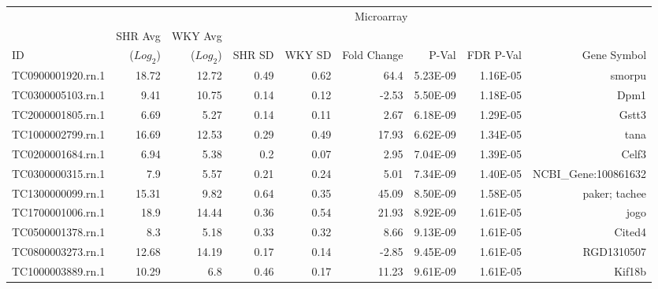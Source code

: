 \begin{sidewaystable}[]
\scriptsize
\centering
\begin{tabular}{lrrrrrrrr}
                  & \multicolumn{8}{c}{Microarray}                                                                                         \\
               & SHR Avg & WKY Avg &  & &  &    & &                    \\
ID                &  ($Log_{2}$) & ($Log_{2}$) & SHR SD & WKY SD & Fold Change & P-Val    & FDR P-Val & Gene Symbol                   \\
\hline
TC0900001920.rn.1 & 18.72          & 12.72          & 0.49   & 0.62   & 64.4        & 5.23E-09 & 1.16E-05  & smorpu                        \\
TC0300005103.rn.1 & 9.41           & 10.75          & 0.14   & 0.12   & -2.53       & 5.50E-09 & 1.18E-05  & Dpm1                          \\
TC2000001805.rn.1 & 6.69           & 5.27           & 0.14   & 0.11   & 2.67        & 6.18E-09 & 1.29E-05  & Gstt3                        \\
TC1000002799.rn.1 & 16.69          & 12.53          & 0.29   & 0.49   & 17.93       & 6.62E-09 & 1.34E-05  & tana                          \\
TC0200001684.rn.1 & 6.94           & 5.38           & 0.2    & 0.07   & 2.95        & 7.04E-09 & 1.39E-05  & Celf3                         \\
TC0300000315.rn.1 & 7.9            & 5.57           & 0.21   & 0.24   & 5.01        & 7.34E-09 & 1.40E-05  & NCBI\_Gene:100861632          \\
TC1300000099.rn.1 & 15.31          & 9.82           & 0.64   & 0.35   & 45.09       & 8.50E-09 & 1.58E-05  & paker; tachee                 \\
TC1700001006.rn.1 & 18.9           & 14.44          & 0.36   & 0.54   & 21.93       & 8.92E-09 & 1.61E-05  & jogo                          \\
TC0500001378.rn.1 & 8.3            & 5.18           & 0.33   & 0.32   & 8.66        & 9.13E-09 & 1.61E-05  & Cited4                        \\
TC0800003273.rn.1 & 12.68          & 14.19          & 0.17   & 0.14   & -2.85       & 9.45E-09 & 1.61E-05  & RGD1310507                    \\
TC1000003889.rn.1 & 10.29          & 6.8            & 0.46   & 0.17   & 11.23       & 9.61E-09 & 1.61E-05  & Kif18b                        \\

\end{tabular}
\end{sidewaystable}
